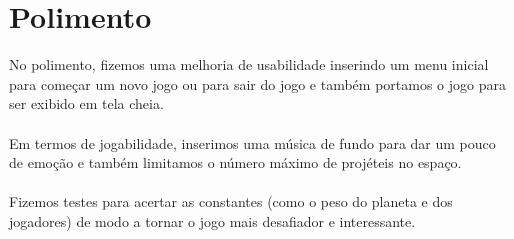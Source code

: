 \documentclass{article}
\begin{document}
\section{Polimento}
No polimento, fizemos uma melhoria de usabilidade inserindo um menu inicial para começar um novo jogo ou para sair do jogo e também portamos o jogo para ser exibido em tela cheia.\\\\
Em termos de jogabilidade, inserimos uma música de fundo para dar um pouco de emoção e também limitamos o número máximo de projéteis no espaço.\\\\
Fizemos testes para acertar as constantes (como o peso do planeta e dos jogadores) de modo a tornar o jogo mais desafiador e interessante.
\end{document}
